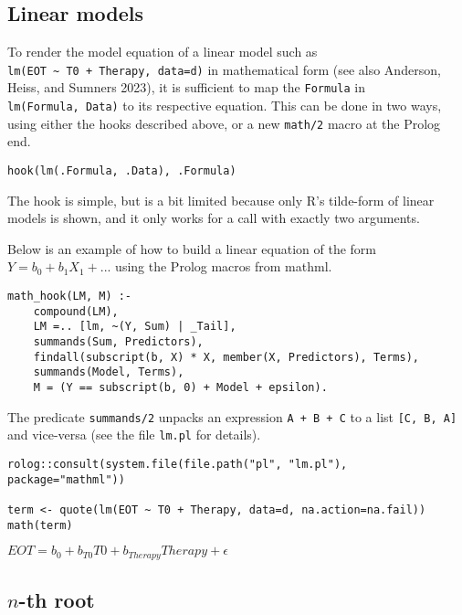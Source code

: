 \hypertarget{linear-models}{%
\subsection{Linear models}\label{linear-models}}

To render the model equation of a linear model such as
\texttt{lm(EOT~\textasciitilde{}~T0~+~Therapy,~data=d)} in mathematical form (see also
Anderson, Heiss, and Sumners 2023), it is sufficient to map the
\texttt{Formula} in \texttt{lm(Formula,~Data)} to its respective equation. This can be
done in two ways, using either the hooks described above, or a new
\texttt{math/2} macro at the Prolog end.

\begin{verbatim}
hook(lm(.Formula, .Data), .Formula)
\end{verbatim}

The hook is simple, but is a bit limited because only R's tilde-form of
linear models is shown, and it only works for a call with exactly two
arguments.

Below is an example of how to build a linear equation of the form
\(Y = b_0 + b_1X_1 + ...\) using the Prolog macros from mathml.

\begin{verbatim}
math_hook(LM, M) :-
    compound(LM),
    LM =.. [lm, ~(Y, Sum) | _Tail],
    summands(Sum, Predictors),
    findall(subscript(b, X) * X, member(X, Predictors), Terms),
    summands(Model, Terms),
    M = (Y == subscript(b, 0) + Model + epsilon).
\end{verbatim}

The predicate \texttt{summands/2} unpacks an expression \texttt{A~+~B~+~C} to a list
\texttt{{[}C,~B,~A{]}} and vice-versa (see the file \texttt{lm.pl} for details).

\begin{verbatim}
rolog::consult(system.file(file.path("pl", "lm.pl"), package="mathml"))

term <- quote(lm(EOT ~ T0 + Therapy, data=d, na.action=na.fail))
math(term)
\end{verbatim}

\({EOT}{=}{{{{b}_{0}}{+}{{{{b}_{T0}}{{}}{T0}}{+}{{{b}_{Therapy}}{{}}{Therapy}}}}{+}{\epsilon}}\)

\hypertarget{n-th-root}{%
\subsection{\texorpdfstring{\(n\)-th root}{n-th root}}\label{n-th-root}}

